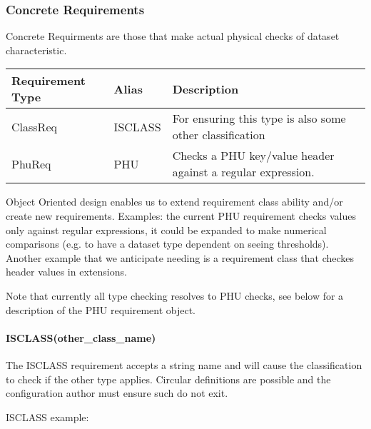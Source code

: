 \documentclass[letterpaper,10pt,english]{sphinxmanual}
\begin{document}
\subsubsection{Concrete Requirements}
\label{creatingAnAstroDataType:concrete-requirements}
Concrete Requirments are those that make actual physical checks of dataset characteristic.

\begin{tabulary}{\linewidth}{|L|L|L|}
\hline
\textbf{
Requirement Type
} & \textbf{
Alias
} & \textbf{
Description
}\\
\hline

ClassReq
 & 
ISCLASS
 & 
For ensuring this type is also some other
classification
\\

PhuReq
 & 
PHU
 & 
Checks a PHU key/value header against a regular
expression.
\\
\hline
\end{tabulary}


Object Oriented design enables us to extend requirement class ability and/or create new
requirements.  Examples: the current PHU requirement checks values only against
regular expressions, it could be expanded to make numerical comparisons (e.g. to
have a dataset type dependent on seeing thresholds). Another example that we
anticipate needing is a requirement class that checkes header values in extensions.

Note that currently all type checking resolves to PHU checks, see below for
a description of the PHU requirement object.


\paragraph{ISCLASS(other\_class\_name)}
\label{creatingAnAstroDataType:isclass-other-class-name}
The ISCLASS requirement accepts a string name and will cause the classification to check
if the other type applies.  Circular definitions are possible and the configuration author
must ensure such do not exit.

ISCLASS example:
\end{document}
